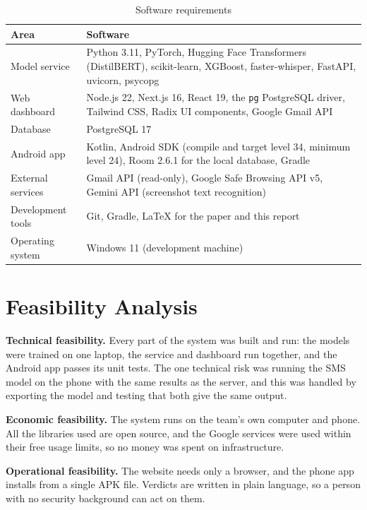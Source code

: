 {\begin{table}[H]
\caption{Software requirements}
\label{tab:sw}
\centering\small{}
\begin{tabular}{|p{3.6cm}|p{10.6cm}|}
\hline
\textbf{Area} & \textbf{Software} \\ \hline
Model service & Python 3.11, PyTorch, Hugging Face Transformers (DistilBERT), scikit-learn, XGBoost, faster-whisper, FastAPI, uvicorn, psycopg \\ \hline
Web dashboard & Node.js 22, Next.js 16, React 19, the \texttt{pg} PostgreSQL driver, Tailwind CSS, Radix UI components, Google Gmail API \\ \hline
Database & PostgreSQL 17 \\ \hline
Android app & Kotlin, Android SDK (compile and target level 34, minimum level 24), Room 2.6.1 for the local database, Gradle \\ \hline
External services & Gmail API (read-only), Google Safe Browsing API v5, Gemini API (screenshot text recognition) \\ \hline
Development tools & Git, Gradle, \LaTeX{} for the paper and this report \\ \hline
Operating system & Windows 11 (development machine) \\ \hline
\end{tabular}
\end{table}

\section{Feasibility Analysis}\label{sec:feas}
\textbf{Technical feasibility.} Every part of the system was built and run: the models were trained on one laptop, the service and dashboard run together, and the Android app passes its unit tests. The one technical risk was running the SMS model on the phone with the same results as the server, and this was handled by exporting the model and testing that both give the same output.

\textbf{Economic feasibility.} The system runs on the team's own computer and phone. All the libraries used are open source, and the Google services were used within their free usage limits, so no money was spent on infrastructure.

\textbf{Operational feasibility.} The website needs only a browser, and the phone app installs from a single APK file. Verdicts are written in plain language, so a person with no security background can act on them.

}

